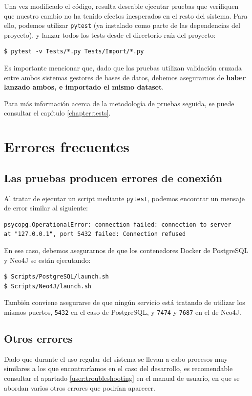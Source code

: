 Una vez modificado el código, resulta deseable ejecutar pruebas que verifiquen que nuestro cambio no ha tenido efectos inesperados en el resto del sistema. Para ello, podemos utilizar \verb|pytest| (ya instalado como parte de las dependencias del proyecto), y lanzar todos los tests desde el directorio raíz del proyecto:

\begin{verbatim}
$ pytest -v Tests/*.py Tests/Import/*.py
\end{verbatim}

Es importante mencionar que, dado que las pruebas utilizan validación cruzada entre ambos sistemas gestores de bases de datos, debemos asegurarnos de \textbf{haber lanzado ambos, e importado el mismo dataset}.

Para más información acerca de la metodología de pruebas seguida, se puede consultar el capítulo \ref{chapter:tests}.

\section{Errores frecuentes}

\subsection{Las pruebas producen errores de conexión}

Al tratar de ejecutar un script mediante \verb|pytest|, podemos encontrar un mensaje de error similar al siguiente:

\begin{verbatim}
psycopg.OperationalError: connection failed: connection to server
at "127.0.0.1", port 5432 failed: Connection refused
\end{verbatim}

En ese caso, debemos asegurarnos de que los contenedores Docker de PostgreSQL y Neo4J se están ejecutando:

\begin{verbatim}
$ Scripts/PostgreSQL/launch.sh
$ Scripts/Neo4J/launch.sh
\end{verbatim}

También conviene asegurarse de que ningún servicio está tratando de utilizar los mismos puertos, \verb|5432| en el caso de PostgreSQL, y \verb|7474| y \verb|7687| en el de Neo4J.

\subsection{Otros errores}

Dado que durante el uso regular del sistema se llevan a cabo procesos muy similares a los que encontraríamos en el caso del desarrollo, es recomendable consultar el apartado \ref{user:troubleshooting} en el manual de usuario, en que se abordan varios otros errores que podrían aparecer.
